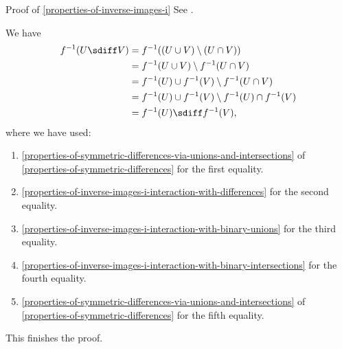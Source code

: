 \begin{Proof}{Proof of \cref{properties-of-inverse-images-i}}
    See \cite{proof-wiki:complement-of-preimage-equals-preimage-of-complement}.

    We have
    \begin{align*}
        f^{-1}(U\sdiff V) &= f^{-1}((U\cup V)\setminus(U\cap V))\\
                          &= f^{-1}(U\cup V)\setminus f^{-1}(U\cap V)\\
                          &= f^{-1}(U)\cup f^{-1}(V)\setminus f^{-1}(U\cap V)\\
                          &= f^{-1}(U)\cup f^{-1}(V)\setminus f^{-1}(U)\cap f^{-1}(V)\\
                          &= f^{-1}(U)\sdiff f^{-1}(V),
    \end{align*}
    where we have used:
    \begin{enumerate}
        \item\label{proof-of-properties-of-inverse-images-i-interaction-with-symmetric-differences-1}\cref{properties-of-symmetric-differences-via-unions-and-intersections} of \cref{properties-of-symmetric-differences} for the first equality.
        \item\label{proof-of-properties-of-inverse-images-i-interaction-with-symmetric-differences-2}\cref{properties-of-inverse-images-i-interaction-with-differences} for the second equality.
        \item\label{proof-of-properties-of-inverse-images-i-interaction-with-symmetric-differences-3}\cref{properties-of-inverse-images-i-interaction-with-binary-unions} for the third equality.
        \item\label{proof-of-properties-of-inverse-images-i-interaction-with-symmetric-differences-4}\cref{properties-of-inverse-images-i-interaction-with-binary-intersections} for the fourth equality.
        \item\label{proof-of-properties-of-inverse-images-i-interaction-with-symmetric-differences-5}\cref{properties-of-symmetric-differences-via-unions-and-intersections} of \cref{properties-of-symmetric-differences} for the fifth equality.
    \end{enumerate}
    This finishes the proof.


\end{Proof}
